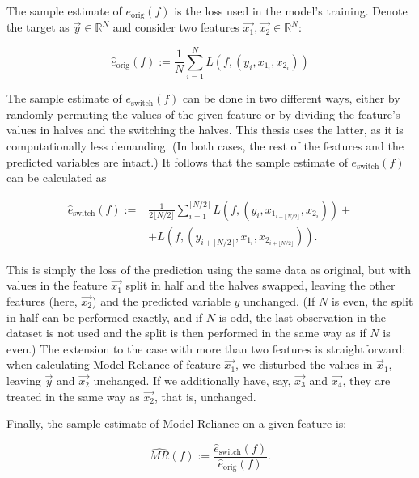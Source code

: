 		The sample estimate of $e_{\text{orig}}(f)$ is the loss used in the model's training. Denote the target as $\vec{y} \in \mathbb{R}^N$ and consider two features $\vec{x_1}, \vec{x_2} \in \mathbb{R}^{N}$:
		
		\begin{equation}
			\hat{e}_{\text{orig}}(f):= \frac{1}{N} \sum_{i=1}^{N} L\left(f, (y_i, x_{1_i}, x_{2_i}) \right)
		\end{equation} 
		
		The sample estimate of $e_{\text{switch}}(f)$ can be done in two different ways, either by randomly permuting the values of the given feature or by dividing the feature's values in halves and the switching the halves. This thesis uses the latter, as it is computationally less demanding. (In both cases, the rest of the features and the predicted variables are intact.) It follows that the sample estimate of $e_{\text{switch}}(f)$ can be calculated as
		
		
		\begin{equation}
			\begin{split}
				\hat{e}_{\text{switch}}(f):= & \frac{1}{2 \lfloor N/2 \rfloor} \sum_{i=1}^{\lfloor N/2 \rfloor} L \left(f, \left( y_i, x_{1_{i+\lfloor N/2 \rfloor}}, x_{2_{i}} \right) \right) + \\ 
				& + L \left( f, \left(y_{i+\lfloor N/2 \rfloor}, x_{1_{i}}, x_{2_{i+\lfloor N/2 \rfloor}} \right) \right). 
			\end{split}
		\end{equation}
		
		This is simply the loss of the prediction using the same data as original, but with values in the feature $\vec{x_1}$ split in half and the halves swapped, leaving the other features (here, $\vec{x_2}$) and the predicted variable $y$ unchanged. (If $N$ is even, the split in half can be performed exactly, and if $N$ is odd, the last observation in the dataset is not used and the split is then performed in the same way as if $N$ is even.) The extension to the case with more than two features is straightforward: when calculating Model Reliance of feature $\vec{x_1}$, we disturbed the values in $\vec{x}_1$, leaving $\vec{y}$ and $\vec{x_2}$ unchanged. If we additionally have, say, $\vec{x_3}$ and $\vec{x_4}$, they are treated in the same way as $\vec{x_2}$, that is, unchanged. 
		
		Finally, the sample estimate of Model Reliance on a given feature is: 
		
		\begin{equation}
			\widehat{MR}(f):=\frac{\hat{e}_{\text{switch}}(f)}{\hat{e}_{\text{orig}}(f)}.
		\end{equation}
			
